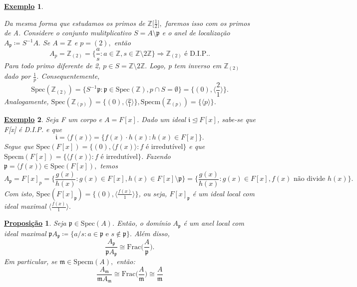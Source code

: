 \documentclass{article}
\newtheorem*{prop*}{\underline{Proposi\c c\~ao}}
\newtheorem{example}{\underline{Exemplo}}
\begin{document}
\begin{example}
\begin{itemize}
\[    \]
    Da mesma forma que estudamos os primos de \(\mathbb{Z}\biggl[\frac{1}{2}\biggr],\) faremos isso com os primos de A. Considere o conjunto mulitplicativo
 \(S = A\setminus{\mathfrak{p}}\) e o anel de localização \(A_{\mathfrak{p}}\coloneqq S^{-1}A.\) Se \(A = \mathbb{Z}\) e \(p = (2),\) então 
    \[
      A_{p} = \mathbb{Z}_{(2)} = \biggl\{\frac{a}{s}: a\in \mathbb{Z}, s\in \mathbb{Z}\setminus{2 \mathbb{Z}}\biggr\} \Rightarrow \mathbb{Z}_{(2)}\text{ é D.I.P.}.
    \]
  Para todo primo diferente de 2, \(p\in S = \mathbb{Z}\setminus{2 \mathbb{Z}}.\) Logo, p tem inverso em \(\mathbb{Z}_{(2)}\) dado por \(\frac{1}{p}\). Consequentemente, 
    \[
      \mathrm{Spec}(\mathbb{Z}_{(2)}) = \biggl\{S^{-1}\mathfrak{p}: \mathfrak{p}\in \mathrm{Spec}(\mathbb{Z}), p\cap S = \emptyset \biggr\} = \{(0), \langle \frac{2}{1} \rangle\}.
    \]
  Analogamente, \(\mathrm{Spec}(\mathbb{Z}_{(p)}) = \{(0), \langle \frac{p}{1} \rangle\}, \mathrm{Specm}(\mathbb{Z}_{(p)}) = \{\langle p \rangle\}\).
  \end{itemize}
  \end{example}
  \begin{example}
    Seja F um corpo e \(A = F[x]\). Dado um ideal \(\mathfrak{i}\trianglelefteq F[x]\), sabe-se que F[x] é D.I.P. e que 
    \[
      \mathfrak{i} = \langle f(x) \rangle = \{f(x)\cdot h(x):h(x)\in F[x]\}.
    \]
    Segue que \(\mathrm{Spec}(F[x]) = \{(0), \langle f(x) \rangle: f \text{ é irredutível}\}\) e que \(\mathrm{Specm}(F[x]) = \{\langle f(x) \rangle: f \text{ é irredutível}\}\).
Fazendo \(\mathfrak{p} = \langle f(x) \rangle\in \mathrm{Spec}(F[x]),\) temos 
  \[
    A_{\mathfrak{p}} = F[x]_{p} = \biggl\{\frac{g(x)}{h(x)}: g(x)\in F[x], h(x)\in F[x]\setminus{\mathfrak{p}}\biggr\} = \biggl\{\frac{g(x)}{h(x)}: g(x)\in F[x], f(x)\text{ não divide }h(x)\biggr\}.
  \]
  Com isto, \(\mathrm{Spec}(F[x]_{\mathfrak{p}}) = \{(0), \langle \frac{f(x)}{1} \rangle\}\), ou seja, \(F[x]_{\mathfrak{p}}\) é um ideal local com ideal maximal \(\langle \frac{f(x)}{1} \rangle.\)
  \end{example}
    \begin{prop*}
      Seja \(\mathfrak{p}\in \mathrm{Spec}(A)\). Então, o domínio \(A_{\mathfrak{p}}\) é um anel local
      com ideal maximal \(\mathfrak{p}A_{\mathfrak{p}}\coloneqq \{a/s: a\in \mathfrak{p}\text{ e }s\not\in \mathfrak{p}\}.\) Além disso,
      \[
        \frac{A_{\mathfrak{p}}}{\mathfrak{p}A_{\mathfrak{p}}}\cong{\mathrm{Frac}\biggl(\frac{A}{\mathfrak{p}}\biggr).}
      \]
      Em particular, se \(\mathfrak{m}\in \mathrm{Specm}(A),\) então:
      \[
        \frac{A_{\mathfrak{m}}}{\mathfrak{m}A_{\mathfrak{m}}}\cong{\mathrm{Frac}\biggl(\frac{A}{\mathfrak{m}}\biggr)} \cong{\frac{A}{\mathfrak{m}}}
      \]
    \end{prop*}
\end{document}
